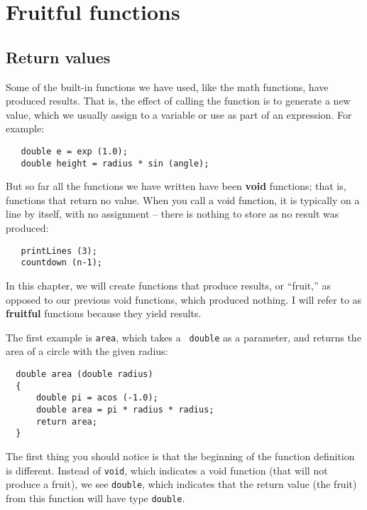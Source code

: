 
\chapter{Fruitful functions}

\section{Return values}

Some of the built-in functions we have used, like the math
functions, have produced results.  That is, the effect of
calling the function is to generate a new value, which we
usually assign to a variable or use as part of an expression.
For example:


\begin{verbatim}
   double e = exp (1.0);
   double height = radius * sin (angle);
\end{verbatim}
%
But so far all the functions we have written have been {\bf void}
functions; that is, functions that return no value.  When you call
a void function, it is typically on a line by itself, with
no assignment -- there is nothing to store as no result was produced:

\begin{verbatim}
   printLines (3);
   countdown (n-1);
\end{verbatim}
%
In this chapter, we will create functions that produce results, or ``fruit,'' 
as opposed to our previous void functions, which produced nothing. 
I will refer to as {\bf fruitful} functions because they yield results.

The first example is {\tt area}, which takes a {\tt
double} as a parameter, and returns the area of a circle with the
given radius:


\begin{verbatim}
  double area (double radius) 
  {
      double pi = acos (-1.0); 
      double area = pi * radius * radius;
      return area;
  }
\end{verbatim}
%
The first thing you should notice is that the beginning of the
function definition is different.  Instead of {\tt void}, which
indicates a void function (that will not produce a fruit), we see {\tt double}, which indicates that
the return value (the fruit) from this function will have type {\tt double}. 

